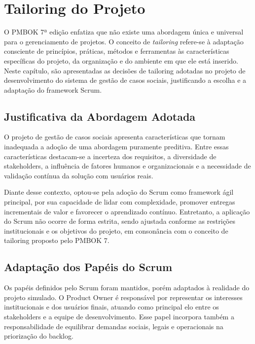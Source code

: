 \chapter{Tailoring do Projeto}\label{chp:Tailoring}

O PMBOK 7ª edição enfatiza que não existe uma abordagem única e universal para o gerenciamento de projetos. O conceito de \textit{tailoring} refere-se à adaptação consciente de princípios, práticas, métodos e ferramentas às características específicas do projeto, da organização e do ambiente em que ele está inserido. Neste capítulo, são apresentadas as decisões de tailoring adotadas no projeto de desenvolvimento do sistema de gestão de casos sociais, justificando a escolha e a adaptação do framework Scrum.

\section{Justificativa da Abordagem Adotada}

O projeto de gestão de casos sociais apresenta características que tornam inadequada a adoção de uma abordagem puramente preditiva. Entre essas características destacam-se a incerteza dos requisitos, a diversidade de stakeholders, a influência de fatores humanos e organizacionais e a necessidade de validação contínua da solução com usuários reais.

Diante desse contexto, optou-se pela adoção do Scrum como framework ágil principal, por sua capacidade de lidar com complexidade, promover entregas incrementais de valor e favorecer o aprendizado contínuo. Entretanto, a aplicação do Scrum não ocorre de forma estrita, sendo ajustada conforme as restrições institucionais e os objetivos do projeto, em consonância com o conceito de tailoring proposto pelo PMBOK 7.

\section{Adaptação dos Papéis do Scrum}

Os papéis definidos pelo Scrum foram mantidos, porém adaptados à realidade do projeto simulado. O Product Owner é responsável por representar os interesses institucionais e dos usuários finais, atuando como principal elo entre os stakeholders e a equipe de desenvolvimento. Esse papel incorpora também a responsabilidade de equilibrar demandas sociais, legais e operacionais na priorização do backlog.

